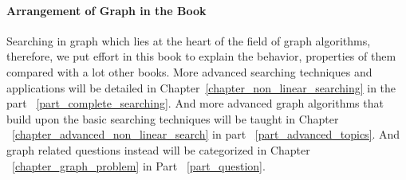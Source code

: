 \documentclass[../main.tex]{subfiles}
\begin{document}
\paragraph{Arrangement of Graph in the Book} Searching in graph which lies at the heart of the field of graph algorithms, therefore, we put effort in this book to explain the behavior, properties of them compared with a lot other books.  More advanced searching techniques and applications will be detailed in Chapter~\ref{chapter_non_linear_searching} in the part ~\ref{part_complete_searching}. And more advanced graph algorithms that build upon the basic searching techniques will be taught in Chapter ~\ref{chapter_advanced_non_linear_search} in part ~\ref{part_advanced_topics}.  And graph related questions instead will be categorized in Chapter ~\ref{chapter_graph_problem} in Part ~\ref{part_question}. 


\end{document}
